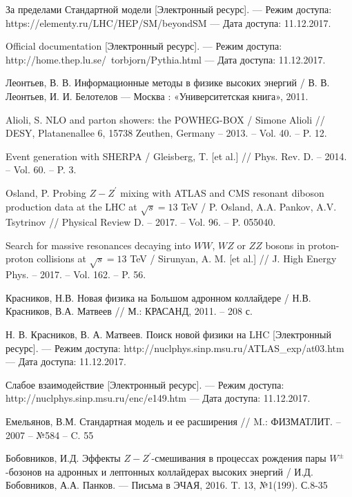 	За пределами Стандартной модели
	[Электронный ресурс].
	— Режим доступа: https://elementy.ru/LHC/HEP/SM/beyondSM 
	— Да­та доступа: 11.12.2017.

	Official documentation
	[Электронный ресурс].
	— Режим доступа: http://home.thep.lu.se/~torbjorn/Pythia.html 
	— Дата доступа: 11.12.2017.

	Леонтьев, В. В. 
	Информационные методы в физике высоких энергий 
	/ В. В. Леонтьев, И. И. Белотелов 
	— Москва : «Университетская книга», 2011.

	Alioli, S. NLO and parton showers: the POWHEG-BOX
	/ Simone Alioli 
	// DESY, Platanenallee 6, 15738 Zeuthen, Germany – 2013. – Vol. 40. – P. 12.

	Event generation with SHERPA
	/ Gleisberg, T. [et al.]  
	// Phys. Rev. D. – 2014. – Vol. 60. – P. 3.

	Osland, P. Probing $Z-Z^\prime$ mixing with ATLAS and CMS resonant diboson production data at the LHC at $\sqrt{s}=13$ TeV
	/ P. Osland, A.A. Pankov, A.V. Tsytrinov 
	// Physical Review D. – 2017. – Vol. 96. – P. 055040.
	
	Search for massive resonances decaying into $WW$, $WZ$ or $ZZ$ bosons in proton-proton collisions at $\sqrt{s}=13$ TeV
	/ Sirunyan, A. M. [et al.] 
	// J. High Energy Phys. – 2017. – Vol. 162. – P. 56.
	
	Красников, Н.В. Новая физика на Большом адронном коллайдере / Н.В. Красников, В.А. Матвеев  
	// М.: КРАСАНД, 2011. – 208 с.
	
	Н. В. Красников, В. А. 
	Матвеев. Поиск новой физики на LHC
	[Электронный ресурс].
	— Режим доступа: http://nuclphys.sinp.msu.ru/ATLAS\_exp/at03.htm 
	— Дата доступа: 11.12.2017.
	
	Слабое взаимодействие 
	[Электронный ресурс].
	— Режим доступа: http://nuclphys.sinp.msu.ru/enc/e149.htm
	— Дата доступа: 11.12.2017.
	
	Емельянов, В.М. Стандартная модель и ее расширения 
	// M.: ФИЗМАТЛИТ. -- 2007 – №584 – C. 55
	
	Бобовников, И.Д. Эффекты $Z-Z^\prime$-смешивания в процессах рождения пары $W^±$-бозонов на адронных и лептонных коллайдерах высоких энергий
	/ И.Д. Бобовников, А.А. Панков.
	— Письма в ЭЧАЯ, 2016. T. 13, №1(199). С.8-35
	
